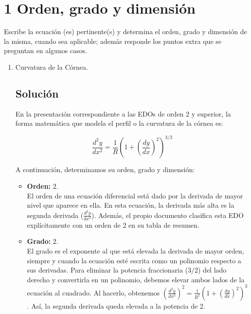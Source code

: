 \section{1 Orden, grado y dimensión}

\begin{tcolorbox}[enunciado]
Escribe la ecuación (es) pertinente(s) y determina el orden, grado y dimensión de la misma, cuando sea aplicable; además responde los puntos extra que se preguntan en algunos casos.
\end{tcolorbox}

\begin{enumerate}[label=\arabic*., leftmargin=*]
    \item Curvatura de la Córnea.
    \subsection{Solución}

    En la presentación correspondiente a las EDOs de orden 2 y superior, la forma matemática que modela el perfil o la curvatura de la córnea es:

    $$\frac{d^2y}{dx^2}=\frac{1}{R}\left(1+\left(\frac{dy}{dx}\right)^2\right)^{3/2}$$

    A continuación, determinamos su orden, grado y dimensión:

    \begin{itemize}[leftmargin=*]
        \item \textbf{Orden:} 2.\\
        El orden de una ecuación diferencial está dado por la derivada de mayor nivel que aparece en ella. En esta ecuación, la derivada más alta es la segunda derivada ($\frac{d^2y}{dx^2}$). Además, el propio documento clasifica esta EDO explícitamente con un orden de 2 en su tabla de resumen.

        \item \textbf{Grado:} 2.\\
        El grado es el exponente al que está elevada la derivada de mayor orden, siempre y cuando la ecuación esté escrita como un polinomio respecto a sus derivadas. Para eliminar la potencia fraccionaria ($3/2$) del lado derecho y convertirla en un polinomio, debemos elevar ambos lados de la ecuación al cuadrado. Al hacerlo, obtenemos $\left(\frac{d^2y}{dx^2}\right)^2=\frac{1}{R^2}\left(1+\left(\frac{dy}{dx}\right)^2\right)^3$. Así, la segunda derivada queda elevada a la potencia de 2.


\end{itemize}
\end{enumerate}
